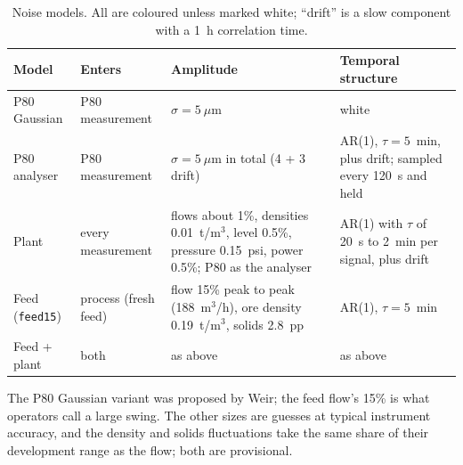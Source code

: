 \begin{table}[tb]
  \centering
  \caption{Noise models. All are coloured unless marked white; ``drift'' is a
    slow component with a 1~h correlation time.}
  \label{tab:mill-noise}
  \small\setlength{\tabcolsep}{3pt}
  \begin{tabular}{@{}llp{}p{}@{}}
    \toprule
    Model & Enters & Amplitude & Temporal structure \\
    \midrule
    P80 Gaussian & P80 measurement & $\sigma = 5~\mu$m & white \\
    P80 analyser & P80 measurement & $\sigma = 5~\mu$m in total (4 + 3 drift) &
      AR(1), $\tau = 5$~min, plus drift; sampled every 120~s and held \\
    Plant & every measurement & flows about 1\%, densities 0.01~t/m$^3$, level
      0.5\%, pressure 0.15~psi, power 0.5\%; P80 as the analyser &
      AR(1) with $\tau$ of 20~s to 2~min per signal, plus drift \\
    Feed (\texttt{feed15}) & process (fresh feed) & flow 15\% peak to peak
      (188~m$^3$/h), ore density 0.19~t/m$^3$, solids 2.8~pp &
      AR(1), $\tau = 5$~min \\
    Feed + plant & both & as above & as above \\
    \bottomrule
  \end{tabular}
\end{table}

The P80 Gaussian variant was proposed by Weir; the feed flow's 15\% is what
operators call a large swing. The other sizes are guesses at typical
instrument accuracy, and the density and solids fluctuations take the same
share of their development range as the flow; both are provisional.

